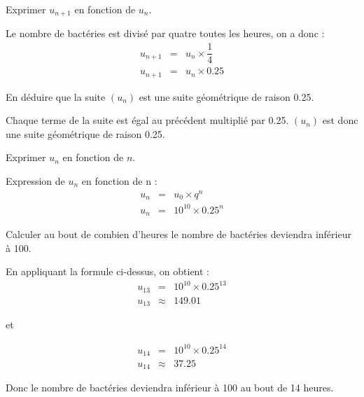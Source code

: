 \begin{questions}
	\question[1] Exprimer $u_{n+1}$ en fonction de $u_n$.
	\begin{solution}
		Le nombre de bactéries est divisé par quatre toutes les heures, on a donc :
		\begin{eqnarray*}
			u_{n+1} &=& u_n \times \dfrac{1}{4}\\
			u_{n+1} &=& u_n \times \num{0.25}
		\end{eqnarray*}
	\end{solution}
	
	\question[1] En déduire que la suite $(u_n)$ est une suite géométrique de raison \num{0.25}.
	\begin{solution}
		Chaque terme de la suite est égal au précédent multiplié par \num{0.25}. $(u_n)$ est donc une suite géométrique de raison \num{0.25}.
	\end{solution}
	
	\question[1] Exprimer $u_n$ en fonction de $n$.
	\begin{solution}
		Expression de $u_n$ en fonction de n :
		\begin{eqnarray*}
			u_n &=& u_0 \times q^n \\
			u_n &=& 10^{10} \times \num{0.25}^n 
		\end{eqnarray*}
	\end{solution}
	
	\question[2] Calculer au bout de combien d'heures le nombre de bactéries deviendra inférieur à 100. 
	\begin{solution}
		En appliquant la formule ci-dessus, on obtient :
		\begin{eqnarray*}
			u_{13} &=& 10^{10} \times 0.25^{13} \\
			u_{13} &\approx& \num{149.01}
		\end{eqnarray*}
	
		et
		
		\begin{eqnarray*}
			u_{14} &=& 10^{10} \times 0.25^{14} \\
			u_{14} &\approx& \num{37.25}
		\end{eqnarray*}
	
	Donc le nombre de bactéries deviendra inférieur à 100 au bout de 14 heures.
	\end{solution}
\end{questions}